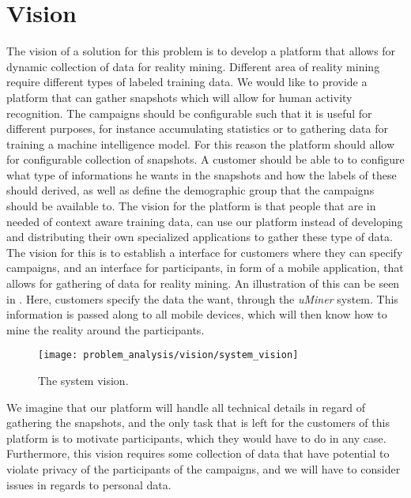 \section{Vision}
\label{sec:vision}
The vision of a solution for this problem is to develop a platform that allows for dynamic collection of data for reality mining. Different area of reality mining require different types of labeled training data. We would like to provide a platform that can gather snapshots which will allow for human activity recognition. The campaigns should be configurable such that it is useful for different purposes, for instance accumulating statistics or to gathering data for training a machine intelligence model. For this reason the platform should allow for configurable collection of snapshots. A customer should be able to to configure what type of informations he wants in the snapshots and how the labels of these should derived, as well as define the demographic group that the campaigns should be available to. The vision for the platform is that people that are in needed of context aware training data, can use our platform instead of developing and distributing their own specialized applications to gather these type of data. The vision for this is to establish a interface for customers where they can specify campaigns, and an interface for participants, in form of a mobile application, that allows for gathering of data for reality mining. An illustration of this can be seen in . Here, customers specify the data the want, through the \emph{uMiner} system. This information is passed along to all mobile devices, which will then know how to mine the reality around the participants. 

\begin{figure}[!htbp]
    \centering
    \texttt{[image: problem\_analysis/vision/system\_vision]}
    \caption{The system vision.}
    \label{fig:system_vision}
\end{figure}
\FloatBarrier

We imagine that our platform will handle all technical details in regard of gathering the snapshots, and the only task that is left for the customers of this platform is to motivate participants, which they would have to do in any case. Furthermore, this vision requires some collection of data that have potential to violate privacy of the participants of the campaigns, and we will have to consider issues in regards to personal data.

